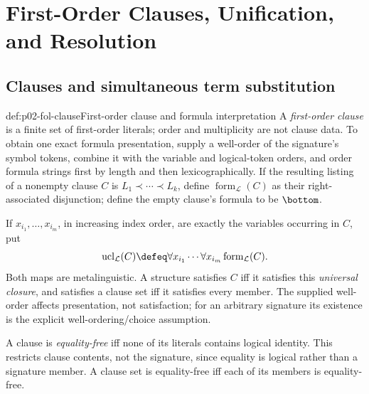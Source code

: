 
\chapter{First-Order Clauses, Unification, and Resolution}
\label{sec:p02-first-order-resolution}

\section{Clauses and simultaneous term substitution}
\label{sec:p02-fol-clauses}

\begin{hbdefinition}{def:p02-fol-clause}{First-order clause and formula interpretation}
A \emph{first-order clause} is a finite set of
first-order literals; order and multiplicity are not clause data.  To obtain
one exact formula presentation, supply a well-order of the signature's symbol
tokens, combine it with the variable and logical-token orders, and order
formula strings first by length and then lexicographically.  If the resulting
listing of a nonempty clause \(C\) is \(L_1\prec\cdots\prec L_k\), define
\(\operatorname{form}_{\mathcal L}(C)\) as their right-associated
disjunction; define the empty clause's formula to be \(\bottom\).

If \(x_{i_1},\ldots,x_{i_m}\), in increasing index order, are exactly the
variables occurring in \(C\), put
\[
 \operatorname{ucl}_{\mathcal L}(C)
 \defeq
 \forall x_{i_1}\cdots\forall x_{i_m}
 \operatorname{form}_{\mathcal L}(C).
\]
Both maps are metalinguistic.  A structure satisfies \(C\) iff it satisfies
this \emph{universal closure}, and
satisfies a clause set iff it satisfies every
member.  The supplied well-order affects presentation, not satisfaction; for
an arbitrary signature its existence is the explicit well-ordering/choice
assumption.

A clause is \emph{equality-free} iff none of its
literals contains logical
identity.  This restricts clause contents, not the signature, since equality
is logical rather than a signature member.  A clause set is equality-free iff
each of its members is equality-free.
\end{hbdefinition}

